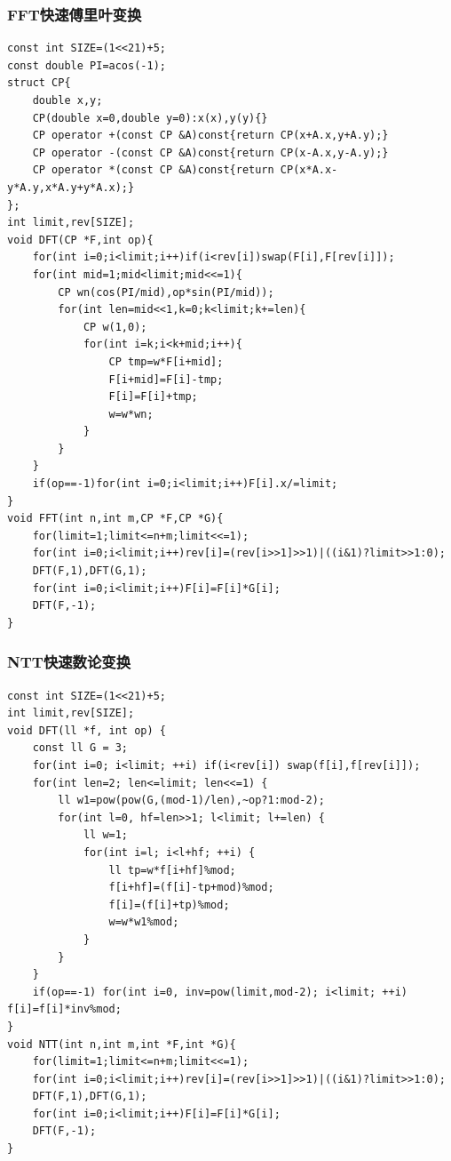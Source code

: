 \documentclass[a4]{ctexart}
\begin{document}
\subsubsection{FFT快速傅里叶变换}
\begin{lstlisting}
const int SIZE=(1<<21)+5;
const double PI=acos(-1);
struct CP{
    double x,y;
    CP(double x=0,double y=0):x(x),y(y){}
    CP operator +(const CP &A)const{return CP(x+A.x,y+A.y);}
    CP operator -(const CP &A)const{return CP(x-A.x,y-A.y);}
    CP operator *(const CP &A)const{return CP(x*A.x-y*A.y,x*A.y+y*A.x);}
};
int limit,rev[SIZE];
void DFT(CP *F,int op){
    for(int i=0;i<limit;i++)if(i<rev[i])swap(F[i],F[rev[i]]);
    for(int mid=1;mid<limit;mid<<=1){
        CP wn(cos(PI/mid),op*sin(PI/mid));
        for(int len=mid<<1,k=0;k<limit;k+=len){
            CP w(1,0);
            for(int i=k;i<k+mid;i++){
                CP tmp=w*F[i+mid];
                F[i+mid]=F[i]-tmp;
                F[i]=F[i]+tmp;
                w=w*wn;
            }
        }
    }
    if(op==-1)for(int i=0;i<limit;i++)F[i].x/=limit;
}
void FFT(int n,int m,CP *F,CP *G){
    for(limit=1;limit<=n+m;limit<<=1);
    for(int i=0;i<limit;i++)rev[i]=(rev[i>>1]>>1)|((i&1)?limit>>1:0);
    DFT(F,1),DFT(G,1);
    for(int i=0;i<limit;i++)F[i]=F[i]*G[i];
    DFT(F,-1);
}
\end{lstlisting}
 
\subsubsection{NTT快速数论变换}
\begin{lstlisting}
const int SIZE=(1<<21)+5;
int limit,rev[SIZE];
void DFT(ll *f, int op) {
    const ll G = 3;
    for(int i=0; i<limit; ++i) if(i<rev[i]) swap(f[i],f[rev[i]]);
    for(int len=2; len<=limit; len<<=1) {
        ll w1=pow(pow(G,(mod-1)/len),~op?1:mod-2);
        for(int l=0, hf=len>>1; l<limit; l+=len) {
            ll w=1;
            for(int i=l; i<l+hf; ++i) {
                ll tp=w*f[i+hf]%mod;
                f[i+hf]=(f[i]-tp+mod)%mod;
                f[i]=(f[i]+tp)%mod;
                w=w*w1%mod;
            }
        }
    }
    if(op==-1) for(int i=0, inv=pow(limit,mod-2); i<limit; ++i) f[i]=f[i]*inv%mod;
}
void NTT(int n,int m,int *F,int *G){
    for(limit=1;limit<=n+m;limit<<=1);
    for(int i=0;i<limit;i++)rev[i]=(rev[i>>1]>>1)|((i&1)?limit>>1:0);
    DFT(F,1),DFT(G,1);
    for(int i=0;i<limit;i++)F[i]=F[i]*G[i];
    DFT(F,-1);
}
\end{lstlisting}
\end{document}

